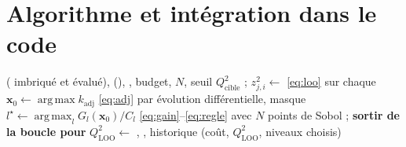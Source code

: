 \documentclass[10pt,a4paper]{article}
\theoremstyle{plain}
\newcommand{\vx}{\bm{x}}
\DeclareMathOperator*{\argmax}{arg\,max}
\begin{document}
\section{Algorithme et intégration dans le code}\label{sec:code}
\begin{algorithm}[h]
\caption{Co-krigeage séquentiel (une évaluation par itération)}\label{alg:seq}
\small
\begin{algorithmic}[1]
\Require {} ( imbriqué et évalué),  (),
  , budget, $N$, seuil $Q^2_{\mathrm{cible}}$
  \State {} ;  
  \State $z^2_{j,i}\gets$ \eqref{eq:loo} sur chaque  
  \State $\vx_0\gets\argmax k_{\mathrm{adj}}$ \eqref{eq:adj} par évolution différentielle, masque 
  \State $l^\star\gets\argmax_l G_l(\vx_0)/C_l$ \eqref{eq:gain}–\eqref{eq:regle} avec $N$ points de Sobol
   
    \State {} ; 
     \textbf{sortir de la boucle pour} 
    \EndIf
  \EndFor
  \State $Q^2_{\mathrm{LOO}}\gets$ 
\EndWhile
\State \Return {}, , historique (coût, $Q^2_{\mathrm{LOO}}$, niveaux choisis)
\end{algorithmic}
\end{algorithm}
\end{document}
